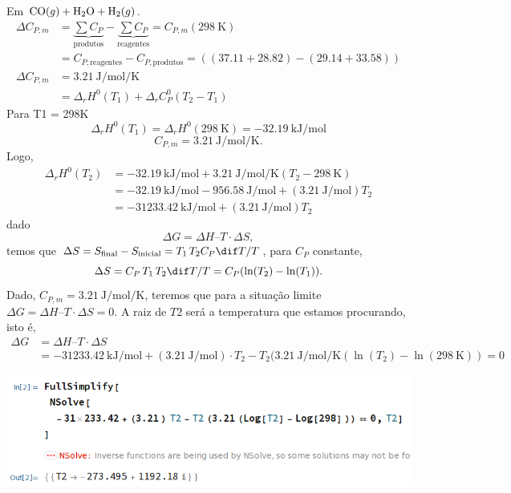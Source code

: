 \documentclass{IMTexam}
\begin{document}
\begin{questions}
\begin{parts}
\begin{solution}
                Em $\ce{CO}(g)+\ce{H2O}+\ce{H2}(g)$.
                \begin{align*}
                    \Delta C_{P,m} &= \underbrace{\sum C_P}_{\text{produtos}} -
                    \underbrace{\sum C_P}_{\text{reagentes}} =
                    C_{P,m}(\SI{298}{\kelvin})\\
                    &= C_{P,\text{reagentes}} -C_{P,\text{produtos}} = ((\num{37,11}+\num{28,82}) - (\num{29,14} + \num{33,58}))\\
                    \Delta C_{P,m}&= \SI{3.21}{\joule\per\mole\per\kelvin}\\
                    &=\Delta_r H^0(T_1) + \Delta_r C_P^0 (T_2-T_1)
                \end{align*}
                Para T1 = 298K
                \[\Delta_rH^0(T_1) = \Delta_rH^0(\SI{298}{\kelvin}) = \SI{-32,19}{\kilo\joule\per\mole}\]
                \[C_{P,m} = \SI{3.21}{\joule\per\mole\per\kelvin}.\]
                Logo,
                \begin{align*}
                    \Delta_r H^0(T_2)&= \SI{-32,19}{\kilo\joule\per\mole} + \SI{3.21}{\joule\per\mole\per\kelvin}(T_2-\SI{298}{\kelvin})\\
                    &= \SI{-32,19}{\kilo\joule\per\mole} - \SI{956,58}{\joule\per\mole} + (\SI{3.21}{\joule\per\mole}) T_2\\
                    &= \SI{-31233.42}{\kilo\joule\per\mole} + (\SI{3.21}{\joule\per\mole}) T_2
                \end{align*}
                dado
                \[\Delta G = \Delta H – T \cdot \Delta S,\]
                temos que $\Delta S = S_{\text{final}} - S_{\text{inicial}} =
                T_1\,T_2C_P\dif T/T$, para $C_P$ constante,
                \[\Delta S  = C_P\,T_1\,T_2\dif T/T= C_P(\ln(T_2) - \ln(T_1)).\]
                Dado, $C_{P,m} = \SI{3.21}{\joule\per\mole\per\kelvin}$, teremos
                que para a situação limite $\Delta G = \Delta H – T\cdot \Delta S = 0$.
                A raiz de $T2$ será a temperatura que estamos procurando, isto é,
                \begin{align*}
                    \Delta G &= \Delta H – T\cdot \Delta S\\
                    &= \SI{-31233.42}{\kilo\joule\per\mole} + (\SI{3.21}{\joule\per\mole})\cdot T_2 -T_2(\SI{3.21}{\joule\per\mole\per\kelvin}(\ln(T_2) - \ln(\SI{298}{\kelvin})) =0
                \end{align*}
                \begin{center}
                    \includegraphics[width=0.8\linewidth]{2021-06-07-17-31-14.png}
                \end{center}


\end{solution}
\end{parts}
\end{questions}
\end{document}
